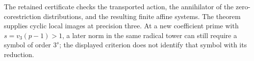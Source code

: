 The retained certificate
checks the transported action, the annihilator
of the zero-corestriction distributions, and
the resulting finite affine systems.
The theorem supplies cyclic local images at
precision three.  At a new coefficient prime
with \(s=v_3(p-1)>1\), a later norm in the
same radical tower can still require a symbol
of order \(3^s\); the displayed criterion does
not identify that symbol with its reduction.
